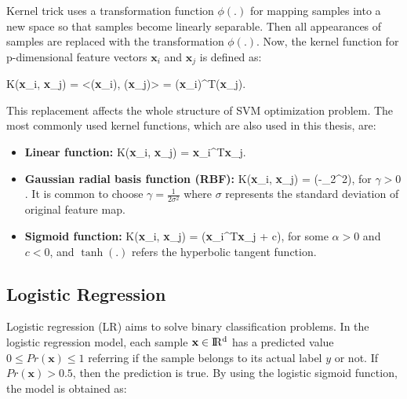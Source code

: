 Kernel trick uses a transformation function $\phi(.)$ for mapping samples into a new space so that samples become linearly separable. Then all appearances of samples are replaced with the transformation $\phi(.)$. Now, the kernel function for p-dimensional feature vectors $\textbf{x}_{i}$ and $\textbf{x}_{j}$ is defined as:

\be
\label{eq:kernel_function}
K(\textbf{x}_{i}, \textbf{x}_{j}) = <\phi(\textbf{x}_{i}), \phi(\textbf{x}_{j})> = \phi(\textbf{x}_{i})^{T}\phi(\textbf{x}_{j}).
\ee

This replacement affects the whole structure of SVM optimization problem. The most commonly used kernel functions, which are also used in this thesis, are:

\begin{itemize}
	\item \textbf{Linear function:}
	\be
	\label{eq:lienar_kernel_function}
	K(\textbf{x}_{i}, \textbf{x}_{j}) = \textbf{x}_{i}^{T}\textbf{x}_{j}.
	\ee
	
	\item \textbf{Gaussian radial basis function (RBF):}
	\be
	\label{eq:rbf_kernel_function}
	K(\textbf{x}_{i}, \textbf{x}_{j}) = \exp(-\gamma {}_{2}^{2})\:,
	\ee
	for $\gamma >0$. It is common to choose $\gamma =\frac{1}{2\sigma^{2}}$ where $\sigma$ represents the standard deviation of original feature map.
	
	\item \textbf{Sigmoid function:}
	\be
	\label{sigmoid_kernel_function}
	K(\textbf{x}_{i}, \textbf{x}_{j}) = \tanh(\alpha \textbf{x}_{i}^{T}\textbf{x}_{j} + c)\:,
	\ee
	for some $\alpha > 0$ and $c < 0$, and $\tanh(.)$ refers the hyperbolic tangent function.
	
\end{itemize}

\subsection{Logistic Regression}


Logistic regression (LR) aims to solve binary classification problems.
In the logistic regression model, each sample $\textbf{x} \in \rm I\!R^{d}$ has a predicted value $ 0 \leq Pr(\textbf{x}) \leq 1$ referring if the sample belongs to its actual label $y$ or not. If $Pr(\textbf{x})>0.5$, then the prediction is true. By using the logistic sigmoid function, the model is obtained as:

